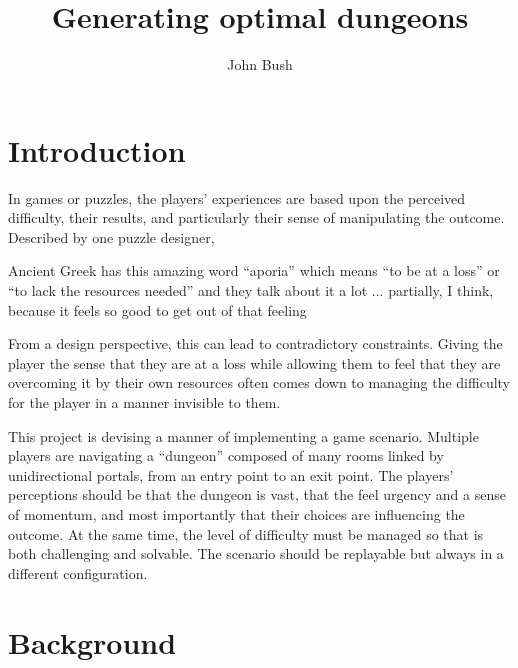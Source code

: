 \documentclass[landscape, a0, final]{a0poster}
\title{Generating optimal dungeons}
\author{John Bush}
\date{}
\begin{document}
 


\begin{minipage}{0.25\linewidth}
\centering 
\begin{minipage}{0.8\linewidth} 

\section{Introduction} 

In games or puzzles, the players' experiences are based upon the perceived difficulty, their results, and particularly their sense of manipulating the outcome.  Described by one puzzle designer\footnotemark , 
    \begin{displayquote} 
        Ancient Greek has this amazing word ``aporia'' which means ``to be at a loss'' or ``to lack the resources needed'' and they talk about it a lot ... partially, I think, because it feels so good to get out of that feeling
    \end{displayquote} 
    From a design perspective, this can lead to contradictory constraints.  Giving the player the sense that they are at a loss while allowing them to feel that they are overcoming it by their own resources often comes down to managing the difficulty for the player in a manner invisible to them. 

This project is devising a manner of implementing a game scenario.  Multiple players are navigating a ``dungeon'' composed of many rooms linked by unidirectional portals, from an entry point to an exit point.  The players' perceptions should be that the dungeon is vast, that the feel urgency and a sense of momentum, and most importantly that their choices are influencing the outcome.  At the same time, the level of difficulty must be managed so that is both challenging and solvable.  The scenario should be replayable but always in a different configuration.

\section{Background} 


\end{minipage}
\end{minipage}
\end{document}
